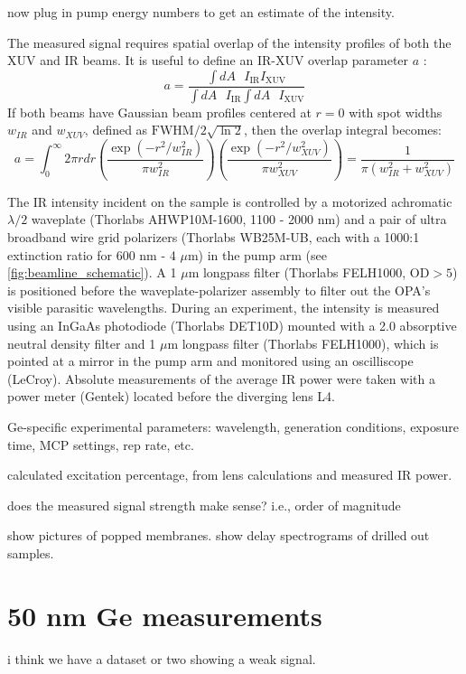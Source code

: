 now plug in pump energy numbers to get an estimate of the intensity.


The measured signal requires spatial overlap of the intensity profiles of both the XUV and IR beams. It is useful to define an IR-XUV overlap parameter $a$ \cite{harbCarrierRelaxationLattice2006}:
\begin{equation}
a = \frac{ \int dA \text{ } I_{\text{IR}} I_{\text{XUV}} }{ \int dA \text{ } I_{\text{IR}} \int dA \text{ } I_{\text{XUV}} }
\end{equation}
If both beams have Gaussian beam profiles centered at $r=0$ with spot widths $w_{IR}$ and $w_{XUV}$, defined as $\text{FWHM} / 2 \sqrt{\ln 2}$, then the overlap integral becomes:
\begin{equation}
a = \int_0^\infty 2 \pi r dr \left( \frac{\exp(-r^2/w_{IR}^2)}{\pi w_{IR}^2} \right) \left( \frac{\exp(-r^2/w_{XUV}^2)}{\pi w_{XUV}^2} \right) = \frac{1}{\pi(w_{IR}^2 + w_{XUV}^2)}
\end{equation}



The IR intensity incident on the sample is controlled by a motorized achromatic $\lambda/2$ waveplate (Thorlabs AHWP10M-1600, 1100 - 2000 nm) and a pair of ultra broadband wire grid polarizers (Thorlabs WB25M-UB, each with a 1000:1 extinction ratio for 600 nm - 4 $\mu$m) in the pump arm (see \cref{fig:beamline_schematic}). A 1 $\mu$m longpass filter (Thorlabs FELH1000, $\text{OD}>5$) is positioned before the waveplate-polarizer assembly to filter out the OPA's visible parasitic wavelengths. During an experiment, the intensity is measured using an InGaAs photodiode (Thorlabs DET10D) mounted with a 2.0 absorptive neutral density filter and 1 $\mu$m longpass filter (Thorlabs FELH1000), which is pointed at a mirror in the pump arm and monitored using an oscilliscope (LeCroy). Absolute measurements of the average IR power were taken with a power meter (Gentek) located before the diverging lens L4.


Ge-specific experimental parameters: wavelength, generation conditions, exposure time, MCP settings, rep rate, etc.

calculated excitation percentage, from lens calculations and measured IR power.

does the measured signal strength make sense? i.e., order of magnitude

show pictures of popped membranes. show delay spectrograms of drilled out samples.

\section{50 nm Ge measurements}
i think we have a dataset or two showing a weak signal.


